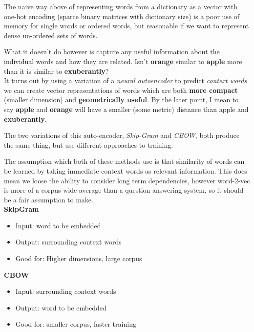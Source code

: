 \documentclass[]{article}
\begin{document}
     The naive way above of representing words from a dictionary as a vector with one-hot encoding (sparce binary matrices with dictionary size) is a poor use of memory for single words or ordered words, but reasonable if we want to represent dense un-ordered sets of words.
     
     What it doesn't do however is capture any useful information about the individual words and how they are related. Isn't \textbf{orange} similar to \textbf{apple} more than it is similar to \textbf{exuberantly}? \\
     
     It turns out by using a variation of a \textit{neural autoencoder} to predict \textit{context words} we can create vector representations of words which are both \textbf{more compact } (smaller dimension) and \textbf{geometrically useful}. By the later point, I mean to say \textbf{apple} and \textbf{orange} will have a smaller (some metric) distance than apple and \textbf{exuberantly}.
     
     The two variations of this auto-encoder, \textit{Skip-Gram} and \textit{CBOW}, both produce the same thing, but use different approaches to training.
     
     The assumption which both of these methods use is that similarity of words can be learned by taking immediate context words as relevant information. This does mean we loose the ability to consider long term dependencies, however word-2-vec is more of a corpus wide average than a question answering system, so it should be a fair assumption to make. \\
     
     \textbf{SkipGram}
     \begin{itemize}
      \item Input: word to be embedded
      \item Output: surrounding context words
      \item Good for: Higher dimensions, large corpus
     \end{itemize}

     
     \textbf{CBOW}
     \begin{itemize}
      \item Input: surrounding context words
      \item Output: word to be embedded
      \item Good for: smaller corpus, faster training
     \end{itemize}
    
\end{document}
